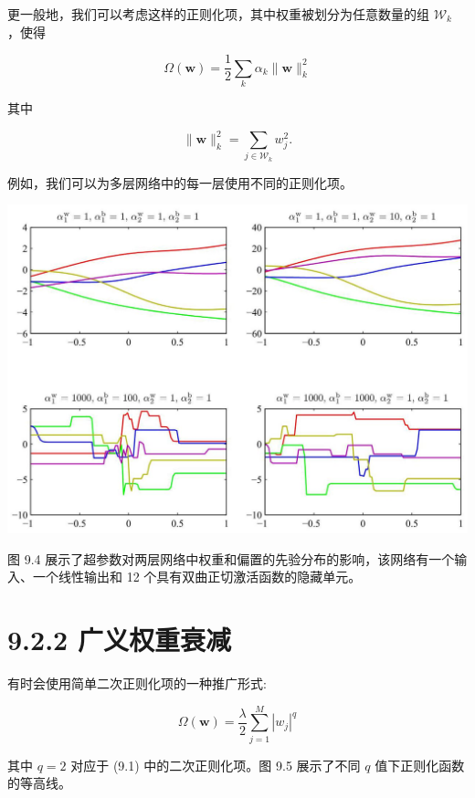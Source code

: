 \documentclass[10pt]{report}
\begin{document}
更一般地，我们可以考虑这样的正则化项，其中权重被划分为任意数量的组 \({\mathcal{W}}_{k}\) ，使得

\[
\Omega \left( \mathbf{w}\right)  = \frac{1}{2}\mathop{\sum }\limits_{k}{\alpha }_{k}\parallel \mathbf{w}{\parallel }_{k}^{2} \tag{9.16}
\]

其中

\[
\parallel \mathbf{w}{\parallel }_{k}^{2} = \mathop{\sum }\limits_{{j \in  {\mathcal{W}}_{k}}}{w}_{j}^{2}. \tag{9.17}
\]

例如，我们可以为多层网络中的每一层使用不同的正则化项。

\begin{center}
\includegraphics[max width=1.0\textwidth]{images/0194e279-9b28-703a-88f4-c3ac21e2010d_283_264_396_1267_905_0.jpg}
\end{center}
\hspace*{3em} 

图 9.4 展示了超参数对两层网络中权重和偏置的先验分布的影响，该网络有一个输入、一个线性输出和 12 个具有双曲正切激活函数的隐藏单元。

\section*{9.2.2 广义权重衰减}

有时会使用简单二次正则化项的一种推广形式:

\[
\Omega \left( \mathbf{w}\right)  = \frac{\lambda }{2}\mathop{\sum }\limits_{{j = 1}}^{M}{\left| {w}_{j}\right| }^{q} \tag{9.18}
\]

其中 \(q = 2\) 对应于 (9.1) 中的二次正则化项。图 9.5 展示了不同 \(q\) 值下正则化函数的等高线。
\end{document}
